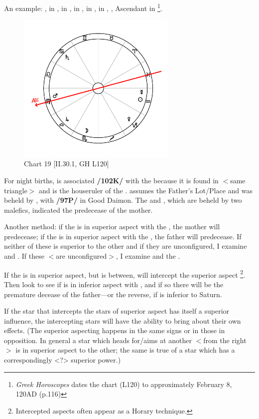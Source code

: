 An example: \Sun, \Mercury\xspace in \Aquarius, \Moon\xspace in \Scorpio, \Saturn\xspace in \Cancer, \Jupiter\xspace in \Libra, \Venus\xspace in \Capricorn, \Mars, Ascendant in \Virgo
\footnote{\textit{Greek Horoscopes} dates the chart (L120) to approximately February 8, 120AD (p.116)}.

\clearpage
\begin{figure}
\centering
\vspace{-20pt}
\includegraphics[width=0.68\textwidth]{charts/2_30_1}
\caption{Chart 19 [II.30.1, GH L120]}
\label{fig:chart19}
\end{figure}

For night births, \Saturn\xspace is associated \textbf{/102K/} with the \Moon\xspace because it is found in \Cancer $<$same triangle$>$ and is the houseruler of the \Sun\xspace. \Saturn\xspace assumes the Father’s Lot/Place and was beheld by \Jupiter, with \Venus\xspace \textbf{/97P/} in Good Daimon. The \Moon\xspace and \Venus, which are beheld by two malefics, indicated the predecease of the mother.

Another method: if the \Sun\xspace is in superior aspect with the \Moon, the mother will predecease; if the \Moon\xspace is in superior aspect with the \Sun, the father will predecease. If neither of these is superior to the other and if they are unconfigured, I examine \Saturn\xspace and \Venus. If these $<$are unconfigured$>$, I examine \Saturn\xspace and the \Moon. 

If the \Sun\xspace is in superior aspect, but \Venus\xspace is between, \Venus\xspace will intercept the superior aspect
\footnote{Intercepted aspects often appear as a Horary technique.}. Then look to see if \Saturn\xspace is in inferior aspect with \Venus, and if so there will be the premature decease of the father—or the reverse, if \Venus\xspace is inferior to Saturn. 

If  the star that intercepts the stars of superior aspect has itself a superior influence, the intercepting stars will have the ability to bring about their own effects. (The superior aspecting happens in the same signs or in those in opposition. In general a star which heads for/aims at another $<$from the right$>$ is in superior aspect to the other; the same
is true of a star which has a correspondingly <?> superior power.)

\newpage
